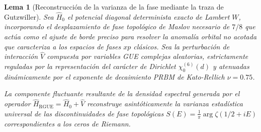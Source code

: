 \documentclass[aps,prl,preprint,superscriptaddress,floatfix]{revtex4-2}
\newtheorem{lemma}[theorem]{Lema}
\begin{document}
\begin{lemma}[Reconstrucción de la varianza de la fase mediante la traza de Gutzwiller]
\label{lemma:phase_absorption_formal_gutzwiller}
Sea $\hat{H}_0$ el potencial diagonal determinista exacto de Lambert $W$, incorporando el desplazamiento de fase topológico de Maslov necesario de $7/8$ que actúa como el ajuste de borde preciso para resolver la anomalía orbital no acotada que caracteriza a los espacios de fases $xp$ clásicos. Sea la perturbación de interacción $\hat{V}$ compuesta por variables GUE complejas aleatorias, estrictamente reguladas por la representación del carácter de Dirichlet $\chi_0^{(6)}(d)$ y atenuadas dinámicamente por el exponente de decaimiento PRBM de Kato-Rellich $\nu = 0.75$.

La componente fluctuante resultante de la densidad espectral generada por el operador $\hat{H}_{\text{RGUE}} = \hat{H}_0 + \hat{V}$ reconstruye asintóticamente la varianza estadística universal de las discontinuidades de fase topológicas $S(E) = \frac{1}{\pi} \arg \zeta(1/2+iE)$ correspondientes a los ceros de Riemann.
\end{lemma}
\end{document}
